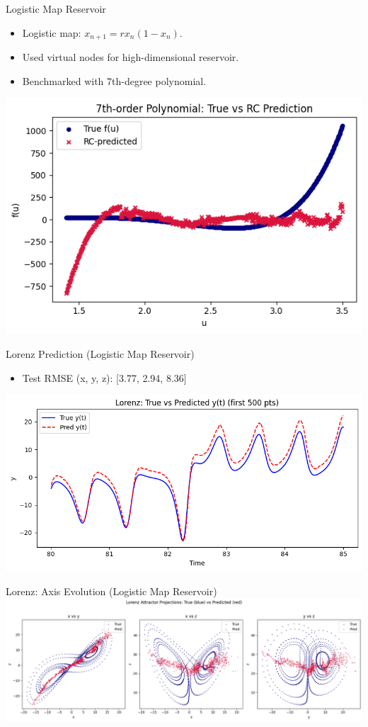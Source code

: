 \documentclass{beamer}
\begin{document}
\begin{frame}{Logistic Map Reservoir}
  \begin{itemize}
    \item Logistic map: $x_{n+1} = r x_n (1-x_n)$.
    \item Used virtual nodes for high-dimensional reservoir.
    \item Benchmarked with 7th-degree polynomial.
  \end{itemize}
  \includegraphics[width=0.75\linewidth]{figures/logistic_7th_degree.png}
\end{frame}

\begin{frame}{Lorenz Prediction (Logistic Map Reservoir)}
  \begin{itemize}
    \item Test RMSE (x, y, z): [3.77, 2.94, 8.36]
  \end{itemize}
  \includegraphics[width=1\linewidth]{figures/lorentz_logistic_pred_true.png}
\end{frame}

\begin{frame}{Lorenz: Axis Evolution (Logistic Map Reservoir)}
  \includegraphics[width=1\linewidth]{figures/lorenz_logistic_pred_diagram.png}
\end{frame}
\end{document}
